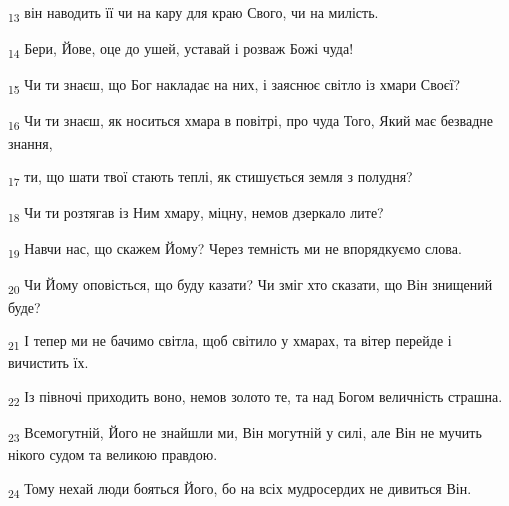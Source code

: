 \begin{tcolorbox}
\textsubscript{13} він наводить її чи на кару для краю Свого, чи на милість.
\end{tcolorbox}
\begin{tcolorbox}
\textsubscript{14} Бери, Йове, оце до ушей, уставай і розваж Божі чуда!
\end{tcolorbox}
\begin{tcolorbox}
\textsubscript{15} Чи ти знаєш, що Бог накладає на них, і заяснює світло із хмари Своєї?
\end{tcolorbox}
\begin{tcolorbox}
\textsubscript{16} Чи ти знаєш, як носиться хмара в повітрі, про чуда Того, Який має безвадне знання,
\end{tcolorbox}
\begin{tcolorbox}
\textsubscript{17} ти, що шати твої стають теплі, як стишується земля з полудня?
\end{tcolorbox}
\begin{tcolorbox}
\textsubscript{18} Чи ти розтягав із Ним хмару, міцну, немов дзеркало лите?
\end{tcolorbox}
\begin{tcolorbox}
\textsubscript{19} Навчи нас, що скажем Йому? Через темність ми не впорядкуємо слова.
\end{tcolorbox}
\begin{tcolorbox}
\textsubscript{20} Чи Йому оповісться, що буду казати? Чи зміг хто сказати, що Він знищений буде?
\end{tcolorbox}
\begin{tcolorbox}
\textsubscript{21} І тепер ми не бачимо світла, щоб світило у хмарах, та вітер перейде і вичистить їх.
\end{tcolorbox}
\begin{tcolorbox}
\textsubscript{22} Із півночі приходить воно, немов золото те, та над Богом величність страшна.
\end{tcolorbox}
\begin{tcolorbox}
\textsubscript{23} Всемогутній, Його не знайшли ми, Він могутній у силі, але Він не мучить нікого судом та великою правдою.
\end{tcolorbox}
\begin{tcolorbox}
\textsubscript{24} Тому нехай люди бояться Його, бо на всіх мудросердих не дивиться Він.
\end{tcolorbox}

